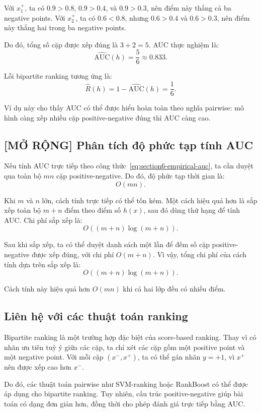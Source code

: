 Với \(x_1^{+}\), ta có \(0.9>0.8\), \(0.9>0.4\), và \(0.9>0.3\), nên điểm này thắng cả ba negative points. Với \(x_2^{+}\), ta có \(0.6<0.8\), nhưng \(0.6>0.4\) và \(0.6>0.3\), nên điểm này thắng hai trong ba negative points.

Do đó, tổng số cặp được xếp đúng là \(3+2=5\). AUC thực nghiệm là:
\[
    \widehat{\mathrm{AUC}}(h)
    =
    \frac{5}{6}
    \approx
    0.833.
\]

Lỗi bipartite ranking tương ứng là:
\[
    \widehat{R}(h)
    =
    1-\widehat{\mathrm{AUC}}(h)
    =
    \frac{1}{6}.
\]

Ví dụ này cho thấy AUC có thể được hiểu hoàn toàn theo nghĩa pairwise: mô hình càng xếp nhiều cặp positive-negative đúng thì AUC càng cao.

\subsection{[MỞ RỘNG] Phân tích độ phức tạp tính AUC}

Nếu tính AUC trực tiếp theo công thức~\eqref{eq:section6-empirical-auc}, ta cần duyệt qua toàn bộ \(mn\) cặp positive-negative. Do đó, độ phức tạp thời gian là:
\[
    O(mn).
\]

Khi \(m\) và \(n\) lớn, cách tính trực tiếp có thể tốn kém. Một cách hiệu quả hơn là sắp xếp toàn bộ \(m+n\) điểm theo điểm số \(h(x)\), sau đó dùng thứ hạng để tính AUC. Chi phí sắp xếp là:
\[
    O((m+n)\log(m+n)).
\]

Sau khi sắp xếp, ta có thể duyệt danh sách một lần để đếm số cặp positive-negative được xếp đúng, với chi phí \(O(m+n)\). Vì vậy, tổng chi phí của cách tính dựa trên sắp xếp là:
\[
    O((m+n)\log(m+n)).
\]

Cách tính này hiệu quả hơn \(O(mn)\) khi cả hai lớp đều có nhiều điểm.

\subsection{Liên hệ với các thuật toán ranking}

Bipartite ranking là một trường hợp đặc biệt của score-based ranking. Thay vì có nhãn ưu tiên tuỳ ý giữa các cặp, ta chỉ xét các cặp gồm một positive point và một negative point. Với mỗi cặp \((x^{-},x^{+})\), ta có thể gán nhãn \(y=+1\), vì \(x^{+}\) nên được xếp cao hơn \(x^{-}\).

Do đó, các thuật toán pairwise như SVM-ranking hoặc RankBoost có thể được áp dụng cho bipartite ranking. Tuy nhiên, cấu trúc positive-negative giúp bài toán có dạng đơn giản hơn, đồng thời cho phép đánh giá trực tiếp bằng AUC.


